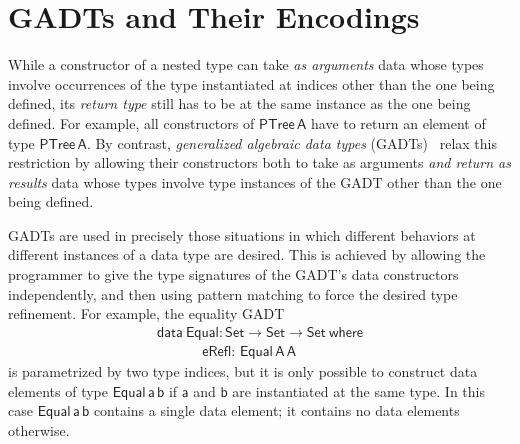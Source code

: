 \documentclass[9pt]{entcs}
\begin{document}
\section{GADTs and Their Encodings}

While a constructor of a nested type can take {\em as arguments} data
whose types involve occurrences of the type instantiated at indices
other than the one being defined, its {\em return type} still has to
be at the same instance as the one being defined. For example, all
constructors of $\mathsf{PTree\,A}$ have to return an element of type
$\mathsf{PTree\,A}$. By contrast, \emph{generalized algebraic data
  types} (GADTs)~\cite{ch03,sp04,xcc03} relax this restriction by
allowing their constructors both to take as arguments \emph{and return
  as results} data whose types involve type instances of the GADT
other than the one being defined.

GADTs are used in precisely those situations in which different
behaviors at different instances of a data type are desired. This is
achieved by allowing the programmer to give the type signatures of the
GADT's data constructors independently, and then using pattern
matching to force the desired type refinement. For example, the
equality GADT
\begin{equation}\label{eq:equal}
\begin{array}{l}
\mathsf{data\ Equal : Set \to Set \to Set\ where}\\
\mathsf{\;\;\;\;\;\;\;\;\;\;\;\,eRefl :\, Equal\,A\,A}
\end{array}
\end{equation}
is parametrized by two type indices, but it is only possible to
construct data elements of type $\mathsf{Equal\,a\,b}$ if $\mathsf{a}$
and $\mathsf{b}$ are instantiated at the same type. In this case
$\mathsf{Equal\,a\,b}$ contains a single data element; it contains no
data elements otherwise.
\end{document}
